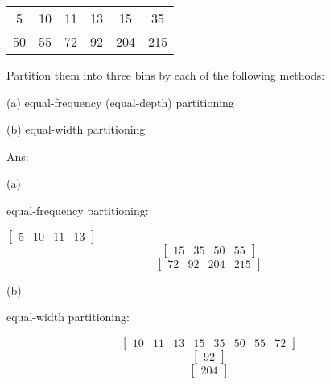 	\vspace{0.5\baselineskip}

	\begin{center}
	\begin{tabular}{ |c|c|c|c|c|c| } 
	\hline

	5 & 10 & 11 & 13 & 15 & 35 \\ 
	50 & 55 & 72 & 92 & 204 & 215 \\

	\hline
	\end{tabular}
	\end{center}

	Partition them into three bins by each of the following methods:

	\begin{description}
		\item (a) equal-frequency (equal-depth) partitioning
		\item (b) equal-width partitioning
	\end{description}

	\vspace{0.5\baselineskip}

	Ans:

	\begin{description}
		\item (a)
		\item[\hspace{1cm}] equal-frequency partitioning: 
	\end{description}

	$
	\begin{bmatrix}
		5 & 10 & 11 & 13
	\end{bmatrix}
	$
	$$
	\begin{bmatrix}
		15 & 35 & 50 & 55
	\end{bmatrix}
	$$
	$$
	\begin{bmatrix}
		72 & 92 & 204 & 215
	\end{bmatrix}
	$$

	\begin{description}
		\item (b)
		\item[\hspace{1cm}] equal-width partitioning: 
	\end{description}

	$$
	\begin{bmatrix}
		10 & 11 & 13 & 15 & 35 & 50 & 55 & 72
	\end{bmatrix}
	$$
	$$
	\begin{bmatrix}
		92
	\end{bmatrix}
	$$
	$$
	\begin{bmatrix}
		204
	\end{bmatrix}
	$$


